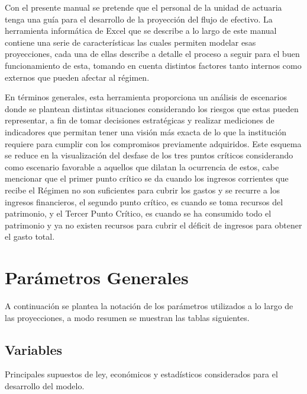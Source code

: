\documentclass[
  letterpaper,
  DIV=11,
  numbers=noendperiod]{scrreprt}
\begin{document}
Con el presente manual se pretende que el personal de la unidad de
actuaria tenga una guía para el desarrollo de la proyección del flujo de
efectivo. La herramienta informática de Excel que se describe a lo largo
de este manual contiene una serie de características las cuales permiten
modelar esas proyecciones, cada una de ellas describe a detalle el
proceso a seguir para el buen funcionamiento de esta, tomando en cuenta
distintos factores tanto internos como externos que pueden afectar al
régimen.

En términos generales, esta herramienta proporciona un análisis de
escenarios donde se plantean distintas situaciones considerando los
riesgos que estas pueden representar, a fin de tomar decisiones
estratégicas y realizar mediciones de indicadores que permitan tener una
visión más exacta de lo que la institución requiere para cumplir con los
compromisos previamente adquiridos. Este esquema se reduce en la
visualización del desfase de los tres puntos críticos considerando como
escenario favorable a aquellos que dilatan la ocurrencia de estos, cabe
mencionar que el primer punto crítico se da cuando los ingresos
corrientes que recibe el Régimen no son suficientes para cubrir los
gastos y se recurre a los ingresos financieros, el segundo punto
crítico, es cuando se toma recursos del patrimonio, y el Tercer Punto
Crítico, es cuando se ha consumido todo el patrimonio y ya no existen
recursos para cubrir el déficit de ingresos para obtener el gasto total.


\hypertarget{paruxe1metros-generales}{%
\chapter{Parámetros Generales}\label{paruxe1metros-generales}}

A continuación se plantea la notación de los parámetros utilizados a lo
largo de las proyecciones, a modo resumen se muestran las tablas
siguientes.

\hypertarget{variables}{%
\section{Variables}\label{variables}}

Principales supuestos de ley, económicos y estadísticos considerados
para el desarrollo del modelo.
\end{document}

